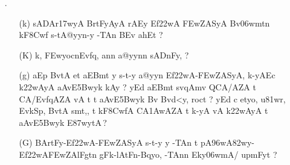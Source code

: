 \begin{itemize}
  {\dn\dnbf .. aA .. s\2-tEf\322wAyA, nvFnA pAr-pErkF c p\388wEt, ..}


\item[{\dn \dnnum \rn{10} }.] \begin{itemize}

            \item[({\dn k})] {\dn sA\2DAr\317wyA\2 BrtFyAyA\2 rAEy Ef\322wA \3FEwZASyA\2 Bv\306wmt\?n kF\38Cwf\2 s\2-tA@yyn-y -TAn\?  BEv ah\0Et {\rs ?\re}}
            
            \item[({\dn K})] {\dn k, \3FEwyocnEvf\?q, an\?n a@yyn\?n sADnFy, {\rs ?\re}}
            
            \item[({\dn g})] {\dn aEp BvtA et aEBmt y s\2-t-y a@yyn\2 Ef\322wA{\rs -\re}\3FEwZASyA, k-yA\2Ec k\322wAyA aAvE\35Bwyk\2 kAy\0 {\rs ?\re} yEd aEBmt {\dn \dnnum {\rs (\re}} sv\?{\qvb}qAm\?v QCA/AZA\2 t\?{\rs ,\re} {\dn \dnnum{\rs (\re}}  CA/Evf\?qAZA\2 vA t\?{\rs ,\re} t aAvE\35Bwyk\2 Bv Bvd<y, roc\?t {\rs ?\re} yEd c etyo, u\381wr, EvkSp, BvtA\2 s\2mt,{\rs ,\re} t kF\38CwfA\2 CA\31AwAZA\2 t\?{\rs ,\re} k-yA\2 vA k\322wAyA\2{\rs ,\re} t aAvE\35Bwyk\2 E\387wytA\,{\rs ?\re}} 
            
            \item[({\dn G})] {\dn BArtFy{\rs -\re}Ef\322wA{\rs -\re}\3FEwZASyA\2 s\2-t-y y -TAn t pA\396wA\382wy{\rs -\re}Ef\322wA\-\3FEwZAlFgt\?n g\5Fk{\rs -\re}lAtFn{\rs -\re}Bqyo, -TAn\?n Eky\306wmA/ upmFy\?t {\rs ?\re}} 
                               
            \end{itemize} 
\end{itemize} 
           

